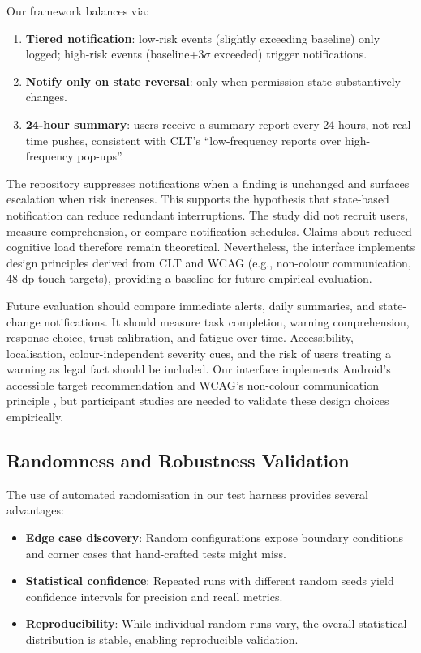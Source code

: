 Our framework balances via:
\begin{enumerate}
\item \textbf{Tiered notification}: low-risk events (slightly exceeding baseline) only logged; high-risk events (baseline+3$\sigma$ exceeded) trigger notifications.
\item \textbf{Notify only on state reversal}: only when permission state substantively changes.
\item \textbf{24-hour summary}: users receive a summary report every 24 hours, not real-time pushes, consistent with CLT's ``low-frequency reports over high-frequency pop-ups''.
\end{enumerate}

The repository suppresses notifications when a finding is unchanged and surfaces escalation when risk increases. This supports the hypothesis that state-based notification can reduce redundant interruptions. The study did not recruit users, measure comprehension, or compare notification schedules. Claims about reduced cognitive load therefore remain theoretical. Nevertheless, the interface implements design principles derived from CLT and WCAG (e.g., non-colour communication, 48 dp touch targets), providing a baseline for future empirical evaluation.

Future evaluation should compare immediate alerts, daily summaries, and state-change notifications. It should measure task completion, warning comprehension, response choice, trust calibration, and fatigue over time. Accessibility, localisation, colour-independent severity cues, and the risk of users treating a warning as legal fact should be included. Our interface implements Android's accessible target recommendation and WCAG's non-colour communication principle \cite{androidaccess,wcag22}, but participant studies are needed to validate these design choices empirically.

\subsection{Randomness and Robustness Validation}

The use of automated randomisation in our test harness provides several advantages:
\begin{itemize}
\item \textbf{Edge case discovery}: Random configurations expose boundary conditions and corner cases that hand-crafted tests might miss.
\item \textbf{Statistical confidence}: Repeated runs with different random seeds yield confidence intervals for precision and recall metrics.
\item \textbf{Reproducibility}: While individual random runs vary, the overall statistical distribution is stable, enabling reproducible validation.
\end{itemize}

